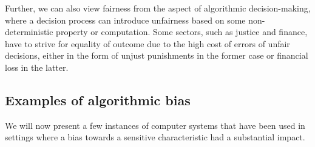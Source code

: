 Further, we can also view fairness from the aspect of algorithmic decision-making, where a decision process can introduce unfairness based on some non-deterministic property or computation. Some sectors, such as justice and finance, have to strive for equality of outcome due to the high cost of errors of unfair decisions, either in the form of unjust punishments in the former case or financial loss in the latter.



\subsection{Examples of algorithmic bias}\label{subsec:02_algo_fairness.examples_of_algo_biass}
We will now present a few instances of computer systems that have been used in settings where a bias towards a sensitive characteristic had a substantial impact.


